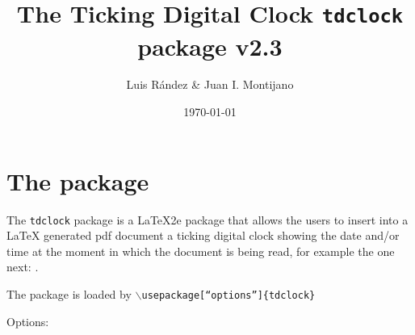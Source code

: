 \documentclass{article}
\title{The Ticking Digital Clock \texttt{tdclock} package v2.3}
\author{Luis R\'{a}ndez \& Juan I. Montijano}
\date{\today}
\begin{document}
\maketitle

\initclock

\section{The package}
The \texttt{tdclock} package is a \LaTeX2e package that
allows the users to insert into a \LaTeX\/ generated pdf document
a ticking digital clock showing the date and/or time at
the moment in which the document
is being read, for example the one next: \quad \tdclock.

\smallskip
The package is loaded by  \texttt{$\backslash$usepackage[``options'']\{tdclock\}}

\medskip

\noindent Options:
\end{document}
